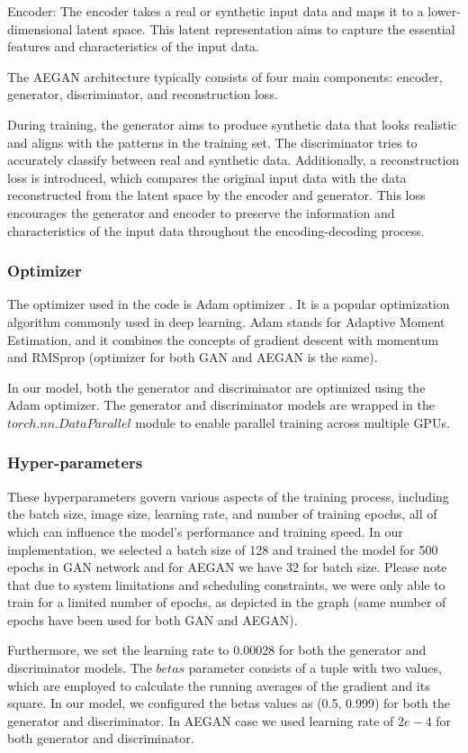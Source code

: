\documentclass[letterpaper]{article} %
\begin{document}
Encoder: The encoder takes a real or synthetic input data and maps it to a lower-dimensional latent space. This latent representation aims to capture the essential features and characteristics of the input data.

The AEGAN architecture typically consists of four main components: encoder, generator, discriminator, and reconstruction loss.

During training, the generator aims to produce synthetic data that looks realistic and aligns with the patterns in the training set. The discriminator tries to accurately classify between real and synthetic data. Additionally, a reconstruction loss is introduced, which compares the original input data with the data reconstructed from the latent space by the encoder and generator. This loss encourages the generator and encoder to preserve the information and characteristics of the input data throughout the encoding-decoding process.
\subsubsection{Optimizer}
The optimizer used in the code is Adam optimizer \cite{adam}. It is a popular optimization algorithm commonly used in deep learning. Adam stands for Adaptive Moment Estimation, and it combines the concepts of gradient descent with momentum and RMSprop (optimizer for both GAN and AEGAN is the same). 

In our model, both the generator and discriminator are optimized using the Adam optimizer. The generator and discriminator models are wrapped in the $torch.nn.DataParallel$ module to enable parallel training across multiple GPUs.
\subsubsection{Hyper-parameters}
These hyperparameters govern various aspects of the training process, including the batch size, image size, learning rate, and number of training epochs, all of which can influence the model's performance and training speed. In our implementation, we selected a batch size of 128 and trained the model for 500 epochs in GAN network and for AEGAN we have 32 for batch size. Please note that due to system limitations and scheduling constraints, we were only able to train for a limited number of epochs, as depicted in the graph (same number of epochs have been used for both GAN and AEGAN).

Furthermore, we set the learning rate to 0.00028 for both the generator and discriminator models. The $betas$ parameter consists of a tuple with two values, which are employed to calculate the running averages of the gradient and its square. In our model, we configured the betas values as (0.5, 0.999) for both the generator and discriminator. In AEGAN case we used learning rate of $2e-4$ for both generator and discriminator. 
\end{document}
